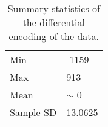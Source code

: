 \begin{table}
    \caption{\label{tab:diff} Summary statistics of the differential encoding of the data.}
    \begin{tabular}{|l|l|}
        \hline
Min & -1159\\

Max & 913\\
\hline
Mean & $\sim$ 0\\
Sample SD & 13.0625\\
	\hline
    \end{tabular}
\end{table}
